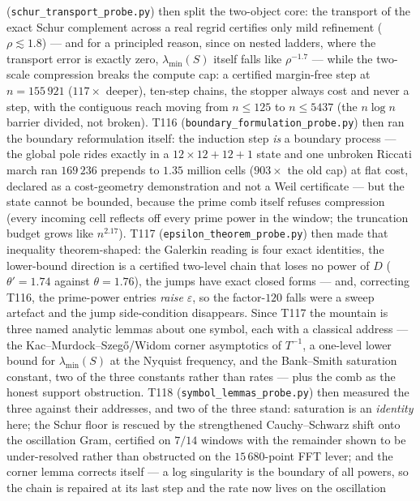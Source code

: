 \documentclass[11pt,a4paper]{article}
\begin{document}
(\texttt{schur\_transport\_probe.py}) then split the two-object core: the transport of the exact
Schur complement across a real regrid certifies only mild refinement ($\rho\lesssim1.8$) --- and
for a principled reason, since on nested ladders, where the transport error is exactly zero,
$\lambda_{\min}(S)$ itself falls like $\rho^{-1.7}$ --- while the two-scale compression breaks
the compute cap: a certified margin-free step at $n=155\,921$ ($117\times$ deeper), ten-step
chains, the stopper always cost and never a step, with the contiguous reach moving from
$n\le125$ to $n\le5437$ (the $n\log n$ barrier divided, not broken). T116
(\texttt{boundary\_formulation\_probe.py}) then ran the boundary reformulation itself: the
induction step \emph{is} a boundary process --- the global pole rides exactly in a
$12\times12+12+1$ state and one unbroken Riccati march ran $169\,236$ prepends to $1.35$
million cells ($903\times$ the old cap) at flat cost, declared as a cost-geometry demonstration
and not a Weil certificate --- but the state cannot be bounded, because the prime comb itself
refuses compression (every incoming cell reflects off every prime power in the window; the
truncation budget grows like $n^{2.17}$). T117 (\texttt{epsilon\_theorem\_probe.py}) then made
that inequality theorem-shaped: the Galerkin reading is four exact identities, the lower-bound
direction is a certified two-level chain that loses no power of $D$ ($\theta'=1.74$ against
$\theta=1.76$), the jumps have exact closed forms --- and, correcting T116, the prime-power
entries \emph{raise} $\varepsilon$, so the factor-$120$ falls were a sweep artefact and the
jump side-condition disappears. Since T117 the mountain is three named analytic lemmas about
one symbol, each with a classical address --- the Kac--Murdock--Szeg\H{o}/Widom corner
asymptotics of $T^{-1}$, a one-level lower bound for $\lambda_{\min}(S)$ at the Nyquist
frequency, and the Bank--Smith saturation constant, two of the three constants rather than
rates --- plus the comb as the honest support obstruction. T118
(\texttt{symbol\_lemmas\_probe.py}) then measured the three against their addresses, and two
of the three stand: saturation is an \emph{identity} here; the Schur floor is rescued by the
strengthened Cauchy--Schwarz shift onto the oscillation Gram, certified on $7/14$ windows with
the remainder shown to be under-resolved rather than obstructed on the $15\,680$-point FFT
lever; and the corner lemma corrects itself --- a log singularity is the boundary of all
powers, so the chain is repaired at its last step and the rate now lives on the oscillation
\end{document}
